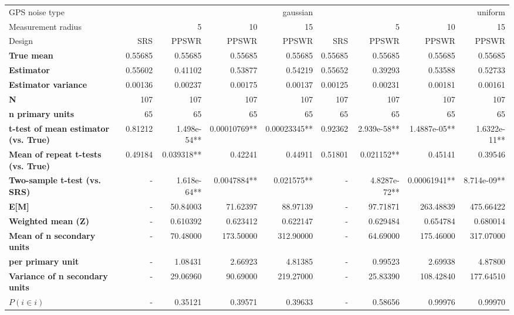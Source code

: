 \begin{tabular}{l|r|rrr|r|rrr}
\toprule
GPS noise type & \multicolumn{4}{r}{gaussian} & \multicolumn{4}{r}{uniform} \\
Measurement radius &  & 5 & 10 & 15 &  & 5 & 10 & 15 \\
Design & SRS & PPSWR & PPSWR & PPSWR & SRS & PPSWR & PPSWR & PPSWR \\
\midrule
\textbf{True mean} &  0.55685 &  0.55685 &  0.55685 &  0.55685 &  0.55685 &  0.55685 &  0.55685 &  0.55685 \\
\textbf{Estimator} & 0.55602 & 0.41102 & 0.53877 & 0.54219 & 0.55652 & 0.39293 & 0.53588 & 0.52733 \\
\textbf{Estimator variance} & 0.00136 & 0.00237 & 0.00175 & 0.00137 & 0.00125 & 0.00231 & 0.00181 & 0.00161 \\
\textbf{N} & 107 & 107 & 107 & 107 & 107 & 107 & 107 & 107 \\
\textbf{n primary units} & 65 & 65 & 65 & 65 & 65 & 65 & 65 & 65 \\
\textbf{t-test of mean estimator (vs. True)} & 0.81212 & 1.498e-54** & 0.00010769** & 0.00023345** & 0.92362 & 2.939e-58** & 1.4887e-05** & 1.6322e-11** \\
\textbf{Mean of repeat t-tests (vs. True)} & 0.49184 & 0.039318** & 0.42241 & 0.44911 & 0.51801 & 0.021152** & 0.45141 & 0.39546 \\
\textbf{Two-sample t-test (vs. SRS)} & - & 1.618e-64** & 0.0047884** & 0.021575** & - & 4.8287e-72** & 0.00061941** & 8.714e-09** \\
\textbf{E[M]} & - & 50.84003 & 71.62397 & 88.97139 & - & 97.71871 & 263.48839 & 475.66422 \\
\textbf{Weighted mean (Z)} & - & 0.610392 & 0.623412 & 0.622147 & - & 0.629484 & 0.654784 & 0.680014 \\
\textbf{Mean of n secondary units} & - & 70.48000 & 173.50000 & 312.90000 & - & 64.69000 & 175.46000 & 317.07000 \\
\textbf{     per primary unit} & - & 1.08431 & 2.66923 & 4.81385 & - & 0.99523 & 2.69938 & 4.87800 \\
\textbf{Variance of n secondary units} & - & 29.06960 & 90.69000 & 219.27000 & - & 25.83390 & 108.42840 & 177.64510 \\
\textbf{$P(i \in i)$} & - & 0.35121 & 0.39571 & 0.39633 & - & 0.58656 & 0.99976 & 0.99970 \\
\bottomrule
\end{tabular}
